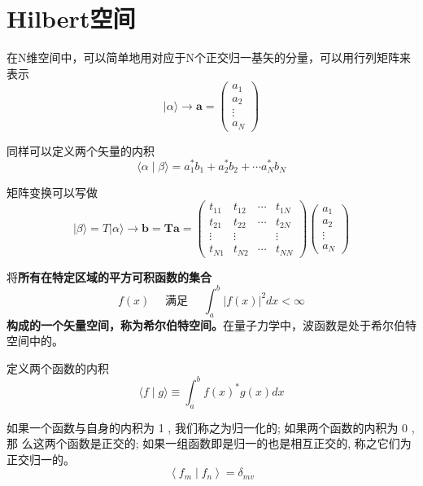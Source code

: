 \section{Hilbert空间}
	在N维空间中，可以简单地用对应于N个正交归一基矢的分量，可以用行列矩阵来表示
	\begin{equation}
		|\alpha\rangle \rightarrow \mathbf{a}=\left(\begin{array}{l}
		a_{1} \\
		a_{2} \\
		\vdots \\
		a_{N}
		\end{array}\right)
	\end{equation}
	
	同样可以定义两个矢量的内积
	\begin{equation}
		\langle\alpha \mid \beta\rangle=a_{1}^{*} b_{1}+a_{2}^{*} b_{2}+\cdots a_{N}^{*} b_{N}
	\end{equation}

	矩阵变换可以写做
	\begin{equation}
		|\beta\rangle=T|\alpha\rangle \rightarrow \mathbf{b}=\mathbf{T a}=\left(\begin{array}{cccc}
		t_{11} & t_{12} & \cdots & t_{1 N} \\
		t_{21} & t_{22} & \cdots & t_{2 N} \\
		\vdots & \vdots & & \vdots \\
		t_{N 1} & t_{N 2} & \cdots & t_{N N}
		\end{array}\right)\left(\begin{array}{l}
		a_{1} \\
		a_{2} \\
		\vdots \\
		a_{N}
		\end{array}\right)
	\end{equation}

	将\textbf{所有在特定区域的平方可积函数的集合}
		\begin{equation}
			f(x) \quad \text { 满足 } \quad \int_{a}^{b}|f(x)|^{2} d x<\infty
		\end{equation}
	\textbf{构成的一个矢量空间，称为希尔伯特空间。}在量子力学中，波函数是处于希尔伯特空间中的。

	定义两个函数的内积
	\begin{equation}
		\langle f \mid g\rangle \equiv \int_{a}^{b} f(x)^{*} g(x) d x
	\end{equation}

	如果一个函数与自身的内积为 1 , 我们称之为归一化的; 如果两个函数的内积为 0 , 那 么这两个函数是正交的; 如果一组函数即是归一的也是相互正交的, 称之它们为正交归一的。
	\begin{equation}
		\left\langle f_{m} \mid f_{n}\right\rangle=\delta_{m v}
	\end{equation}
